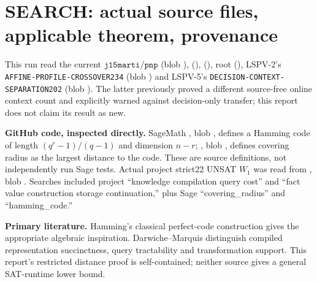 \documentclass[10pt]{article}
\begin{document}
\section{SEARCH: actual source files, applicable theorem, provenance}
This run read the current $\texttt{j15marti/pnp}$  (blob \texttt{}),  (\texttt{}),  (\texttt{}), root  (\texttt{}), LSPV-2's \texttt{AFFINE-PROFILE-CROSSOVER234} (blob \texttt{}) and LSPV-5's \texttt{DECISION-CONTEXT-SEPARATION202} (blob \texttt{}). The latter previously proved a different source-free online context count and explicitly warned against decision-only transfer; this report does not claim its result as new.

\noindent\textbf{GitHub code, inspected directly.} SageMath , blob \texttt{}, defines a Hamming code of length $(q^r-1)/(q-1)$ and dimension $n-r$; , blob \texttt{}, defines covering radius as the largest distance to the code. These are source definitions, not independently run Sage tests. Actual project strict22 UNSAT $W_1$ was read from , blob \texttt{}. Searches included project ``knowledge compilation query cost'' and ``fact value construction storage continuation,'' plus Sage ``covering\_radius'' and ``hamming\_code.''

\noindent\textbf{Primary literature.} Hamming's classical perfect-code construction \cite{hamming1950} gives the appropriate algebraic inspiration. Darwiche--Marquis \cite{darwiche2002} distinguish compiled representation succinctness, query tractability and transformation support. This report's restricted distance proof is self-contained; neither source gives a general SAT-runtime lower bound.
\end{document}
